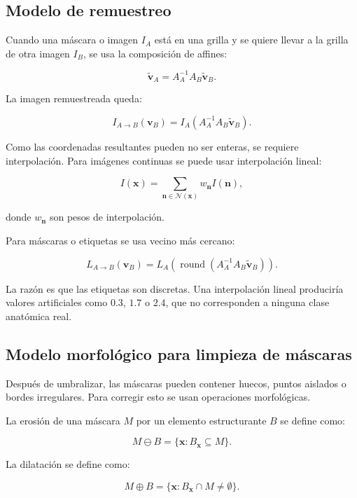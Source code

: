 \documentclass[12pt,a4paper]{article}
\begin{document}
\subsection{Modelo de remuestreo}

Cuando una máscara o imagen \(I_A\) está en una grilla y se quiere llevar a la grilla de otra imagen \(I_B\), se usa la composición de affines:

\[
\tilde{\mathbf{v}}_A
=
A_A^{-1}
A_B
\tilde{\mathbf{v}}_B.
\]

La imagen remuestreada queda:

\[
I_{A\rightarrow B}(\mathbf{v}_B)
=
I_A
\left(
A_A^{-1}A_B\tilde{\mathbf{v}}_B
\right).
\]

Como las coordenadas resultantes pueden no ser enteras, se requiere interpolación. Para imágenes continuas se puede usar interpolación lineal:

\[
I(\mathbf{x})
=
\sum_{\mathbf{n}\in\mathcal{N}(\mathbf{x})}
w_{\mathbf{n}} I(\mathbf{n}),
\]

donde \(w_{\mathbf{n}}\) son pesos de interpolación.

Para máscaras o etiquetas se usa vecino más cercano:

\[
L_{A\rightarrow B}(\mathbf{v}_B)
=
L_A
\left(
\operatorname{round}
\left(
A_A^{-1}A_B\tilde{\mathbf{v}}_B
\right)
\right).
\]

La razón es que las etiquetas son discretas. Una interpolación lineal produciría valores artificiales como \(0.3\), \(1.7\) o \(2.4\), que no corresponden a ninguna clase anatómica real.

\subsection{Modelo morfológico para limpieza de máscaras}

Después de umbralizar, las máscaras pueden contener huecos, puntos aislados o bordes irregulares. Para corregir esto se usan operaciones morfológicas.

La erosión de una máscara \(M\) por un elemento estructurante \(B\) se define como:

\[
M \ominus B
=
\{\mathbf{x}: B_{\mathbf{x}}\subseteq M\}.
\]

La dilatación se define como:

\[
M \oplus B
=
\{\mathbf{x}: B_{\mathbf{x}}\cap M \neq \emptyset\}.
\]
\end{document}
